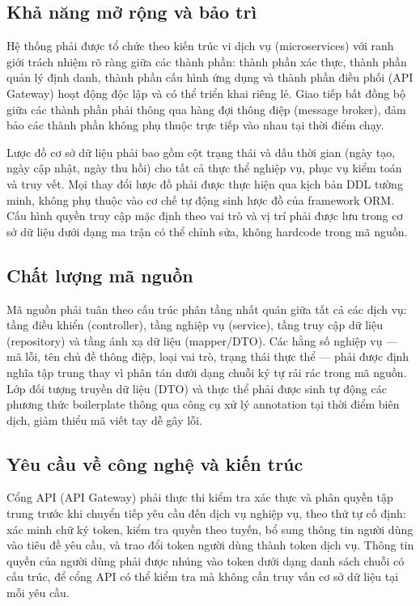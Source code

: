 \documentclass[../DoAn.tex]{subfiles}
\begin{document}
\subsection{Khả năng mở rộng và bảo trì}
\label{subsection:2.4.3}

Hệ thống phải được tổ chức theo kiến trúc vi dịch vụ (microservices) với ranh giới trách nhiệm rõ ràng giữa các thành phần: thành phần xác thực, thành phần quản lý định danh, thành phần cấu hình ứng dụng và thành phần điều phối (API Gateway) hoạt động độc lập và có thể triển khai riêng lẻ. Giao tiếp bất đồng bộ giữa các thành phần phải thông qua hàng đợi thông điệp (message broker), đảm bảo các thành phần không phụ thuộc trực tiếp vào nhau tại thời điểm chạy.

Lược đồ cơ sở dữ liệu phải bao gồm cột trạng thái và dấu thời gian (ngày tạo, ngày cập nhật, ngày thu hồi) cho tất cả thực thể nghiệp vụ, phục vụ kiểm toán và truy vết. Mọi thay đổi lược đồ phải được thực hiện qua kịch bản DDL tường minh, không phụ thuộc vào cơ chế tự động sinh lược đồ của framework ORM. Cấu hình quyền truy cập mặc định theo vai trò và vị trí phải được lưu trong cơ sở dữ liệu dưới dạng ma trận có thể chỉnh sửa, không hardcode trong mã nguồn.

\subsection{Chất lượng mã nguồn}
\label{subsection:2.4.4}

Mã nguồn phải tuân theo cấu trúc phân tầng nhất quán giữa tất cả các dịch vụ: tầng điều khiển (controller), tầng nghiệp vụ (service), tầng truy cập dữ liệu (repository) và tầng ánh xạ dữ liệu (mapper/DTO). Các hằng số nghiệp vụ — mã lỗi, tên chủ đề thông điệp, loại vai trò, trạng thái thực thể — phải được định nghĩa tập trung thay vì phân tán dưới dạng chuỗi ký tự rải rác trong mã nguồn. Lớp đối tượng truyền dữ liệu (DTO) và thực thể phải được sinh tự động các phương thức boilerplate thông qua công cụ xử lý annotation tại thời điểm biên dịch, giảm thiểu mã viết tay dễ gây lỗi.

\subsection{Yêu cầu về công nghệ và kiến trúc}
\label{subsection:2.4.5}

Cổng API (API Gateway) phải thực thi kiểm tra xác thực và phân quyền tập trung trước khi chuyển tiếp yêu cầu đến dịch vụ nghiệp vụ, theo thứ tự cố định: xác minh chữ ký token, kiểm tra quyền theo tuyến, bổ sung thông tin người dùng vào tiêu đề yêu cầu, và trao đổi token người dùng thành token dịch vụ. Thông tin quyền của người dùng phải được nhúng vào token dưới dạng danh sách chuỗi có cấu trúc, để cổng API có thể kiểm tra mà không cần truy vấn cơ sở dữ liệu tại mỗi yêu cầu.
\end{document}
